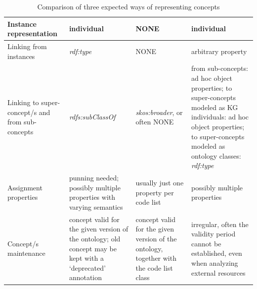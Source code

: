 \begin{table}[pt]
\begin{tabular}{|P{3.6cm}|P{3.6cm}|P{3.6cm}|P{3.6cm}|}
Instance representation                          & individual                                                                                                      & NONE                                                  & individual                                                                                                                                                                                                                        \\ \hline
Linking from instances                           & \textit{rdf:type}                                                                                                        & NONE                                                & arbitrary property                                                                                                                                                                                                                \\ \hline
Linking to super-concept/s and from sub-concepts & \textit{rdfs:subClassOf}                                                                                                 & \textit{skos:broader}, or often NONE                                                 & from sub-concepts: ad hoc object properties; to super-concepts modeled as KG individuals: ad hoc object properties; to super-concepts modeled as ontology classes: \textit{rdf:type} \\ \hline
Assignment properties                           & punning needed; possibly multiple properties with varying semantics                                    & usually just one property per code list                                      & possibly multiple properties                                                                                                                                                                                                      \\ \hline
Concept/s maintenance   & concept valid for the given version of the ontology; old concept may be kept with a `deprecated' annotation 
& concept valid for the given version of the ontology, together with the code list class     & irregular, often the validity period cannot be established, even when analyzing external resources                                                                                                                                       \\ \hline


\end{tabular}

  \caption{Comparison of three expected ways of representing concepts}
  \label{tab:comparison}
\end{table}



